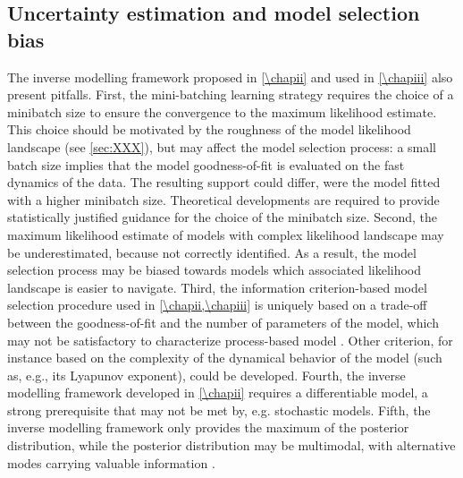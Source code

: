 \subsection{Uncertainty estimation and model selection bias}
The inverse modelling framework proposed in \cref{\chapii} and used in \cref{\chapiii} also present pitfalls.
%
First, the mini-batching learning strategy requires the choice of a minibatch size to ensure the convergence to the maximum likelihood estimate. This choice should be motivated by the roughness of the model likelihood landscape (see \cref{sec:XXX}), but may affect the model selection process:
a small batch size implies that the model goodness-of-fit is evaluated on the fast dynamics of the data. The resulting support could differ, were the model fitted with a higher minibatch size. Theoretical developments are required to provide statistically justified guidance for the choice of the minibatch size. 
% 
Second, the maximum likelihood estimate of models with complex likelihood landscape may be underestimated, because not correctly identified. As a result, the model selection process may be biased towards models which associated likelihood landscape is easier to navigate. 
% 
Third, the information criterion-based model selection procedure used in \cref{\chapii,\chapiii} is uniquely based on a trade-off between the goodness-of-fit and the number of parameters of the model, which may not be satisfactory to characterize process-based model \citep{Clermont2015}. 
% 
Other criterion, for instance based on the complexity of the dynamical behavior of the model (such as, e.g., its Lyapunov exponent), could be developed.
% 
Fourth, the inverse modelling framework developed in \cref{\chapii} requires a differentiable model, a strong prerequisite that may not be met by, e.g. stochastic models. 
% 
Fifth, the inverse modelling framework only provides the maximum of the posterior distribution, while the posterior distribution may be multimodal, with alternative modes carrying valuable information \citep{Wilson2020}.%

